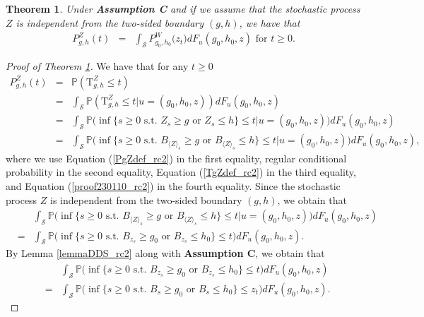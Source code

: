 \documentclass[aop]{imsart}
\theoremstyle{plain}
\newtheorem{theorem}{Theorem}[section]
\theoremstyle{remark}
\newcommand{\proba}{\mathbb{P}}
\newcommand{\Tau}{\mathrm{T}}
\begin{document}
\begin{theorem}
\label{theorem_rc2}
Under \textbf{Assumption C} and if we assume that the stochastic process $Z$ is independent from the two-sided boundary $(g,h)$, we have that
\begin{eqnarray}
\label{eq_theorem_rc2}
P_{g,h}^Z (t) & = & \int_{\mathcal{S}} P_{g_0,h_0}^W \big(z_t\big) dF_{u}(g_0,h_0,z)\text{ for } t \geq 0.
\end{eqnarray}
\end{theorem}
\begin{proof}[Proof of Theorem \ref{theorem_rc2}]
We have that for any $t \geq 0$
\begin{eqnarray}
\nonumber P_{g,h}^Z(t) & = & \proba (\Tau^Z_{g,h} \leq t)\\ \nonumber & = & \int_{\mathcal{S}} \proba (\Tau^{Z}_{g,h} \leq t | u=(g_0,h_0,z)) dF_{u}(g_0,h_0,z)\\ \nonumber 
& = & \int_{\mathcal{S}} \proba \big(\inf \{s \geq 0 \text{ s.t. } Z_s \geq g \text{ or } Z_s \leq h \} \leq t |u=(g_0,h_0,z)) dF_{u}(g_0,h_0,z)\\ \label{eq_proof_theorem_rc21} 
& = & \int_{\mathcal{S}} \proba \big(\inf \{s \geq 0 \text{ s.t. } B_{\langle Z\rangle_{s}}  \geq g \text{ or } B_{\langle Z\rangle_{s}}  \leq h \} \leq t |u=(g_0,h_0,z)) dF_{u}(g_0,h_0,z),
\end{eqnarray}
where we use Equation (\ref{PgZdef_rc2}) in the first equality, regular conditional probability in the second equality, Equation (\ref{TgZdef_rc2}) in the third equality, and Equation (\ref{proof230110_rc2}) in the fourth equality. Since the stochastic process $Z$ is independent from the two-sided boundary $(g,h)$, we obtain that
\begin{eqnarray}
\label{eq_proof_theorem_rc211} 
&  & \int_{\mathcal{S}} \proba \big(\inf \{s \geq 0 \text{ s.t. } B_{\langle Z\rangle_{s}}  \geq g \text{ or } B_{\langle Z\rangle_{s}}  \leq h \} \leq t |u=(g_0,h_0,z)) dF_{u}(g_0,h_0,z) \\ \nonumber &=& \int_{\mathcal{S}} \proba \big(\inf \{s \geq 0 \text{ s.t. } B_{z_{s}}  \geq g_0 \text{ or } B_{z_{s}}  \leq h_0 \} \leq t) dF_{u}(g_0,h_0,z).
\end{eqnarray}
By Lemma \ref{lemmaDDS_rc2} along with \textbf{Assumption C}, we obtain that
\begin{eqnarray}
\label{eq_proof_theorem_rc22}&&\int_{\mathcal{S}} \proba \big(\inf \{s \geq 0 \text{ s.t. } B_{z_{s}}  \geq g_0 \text{ or } B_{z_{s}}  \leq h_0 \} \leq t) dF_{u}(g_0,h_0,z)\\ \nonumber &=& \int_{\mathcal{S}} \proba \big(\inf \{s \geq 0 \text{ s.t. } B_{s}  \geq g_0 \text{ or } B_{s}  \leq h_0 \} \leq z_t) dF_{u}(g_0,h_0,z).

\end{eqnarray}
\end{proof}
\end{document}
